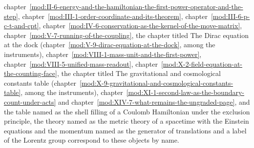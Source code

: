 \begin{chbridge}
chapter~\ref{mod:II-6-energy-and-the-hamiltonian-the-first-power-operator-and-the-step}, chapter~\ref{mod:III-1-order-coordinate-and-its-theorem}, chapter~\ref{mod:III-6-p-c-t-and-cpt}, chapter~\ref{mod:IV-6-conservation-as-the-kernel-of-the-move-matrix}, chapter~\ref{mod:V-7-running-of-the-coupling}, the chapter titled The Dirac equation at the dock (chapter~\ref{mod:V-9-dirac-equation-at-the-dock}, among the instruments), chapter~\ref{mod:VIII-1-mass-unit-and-the-first-power}, chapter~\ref{mod:VIII-5-unified-mass-readout}, chapter~\ref{mod:X-2-field-equation-at-the-counting-face}, the chapter titled The gravitational and cosmological constants table (chapter~\ref{mod:X-9-gravitational-and-cosmological-constants-table}, among the instruments), chapter~\ref{mod:XI-1-second-law-as-the-boundary-count-under-acts} and chapter~\ref{mod:XIV-7-what-remains-the-ungraded-page}, and the table named as the shell filling of a Coulomb Hamiltonian under the exclusion principle, the theory named as the metric theory of a spacetime with the Einstein equations and the momentum named as the generator of translations and a label of the Lorentz group correspond to these objects by name.
\end{chbridge}

